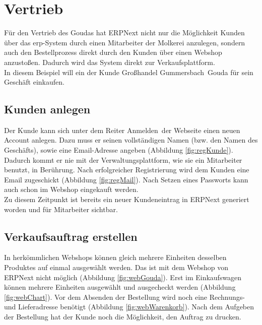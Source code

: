 \section{Vertrieb}
Für den Vertrieb des Goudas  hat ERPNext nicht nur die Möglichkeit Kunden über das \gls{erp}-System durch einen Mitarbeiter der Molkerei anzulegen, sondern auch den Bestellprozess direkt durch den Kunden über einen Webshop anzustoßen. Dadurch wird das System direkt zur Verkaufsplattform.\\
In diesem Beispiel will ein der Kunde \glqq Großhandel Gummersbach\grqq\ Gouda für sein Geschäft einkaufen.

\subsection{Kunden anlegen}
Der Kunde kann sich unter dem Reiter \glqq Anmelden\grqq\ der Webseite einen neuen Account anlegen. Dazu muss er seinen vollständigen Namen (bzw. den Namen des Geschäfts), sowie eine Email-Adresse angeben (\vgl Abbildung \ref{fig:regKunde}). Dadurch kommt er nie mit der Verwaltungsplattform, wie sie ein Mitarbeiter benutzt, in Berührung. Nach erfolgreicher Registrierung wird dem Kunden eine Email zugeschickt (\vgl Abbildung \ref{fig:regMail}). Nach Setzen eines Passworts kann auch schon im Webshop eingekauft werden. \\ 
Zu diesem Zeitpunkt ist bereits ein neuer Kundeneintrag in ERPNext generiert worden und für Mitarbeiter sichtbar.

\subsection{Verkaufsauftrag erstellen}
In herkömmlichen Webshops können gleich mehrere Einheiten desselben Produktes auf einmal ausgewählt werden. Das ist mit dem Webshop von ERPNext nicht möglich (\vgl Abbildung \ref{fig:webGouda}). Erst im Einkaufswagen können mehrere Einheiten ausgewählt und ausgecheckt werden (\vgl Abbildung \ref{fig:webChart}). Vor dem Absenden der Bestellung wird noch eine Rechnungs- und Lieferadresse benötigt (\vgl Abbildung \ref{fig:webWarenkorb}). Nach dem Aufgeben der Bestellung hat der Kunde noch die Möglichkeit, den Auftrag zu drucken.

